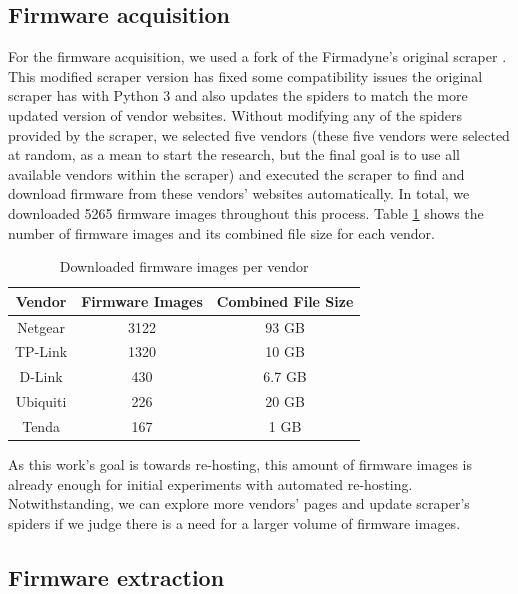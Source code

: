 \documentclass[12pt]{article}
\begin{document}
\subsection{Firmware acquisition}

For the firmware acquisition, we used a fork of the Firmadyne's original scraper \cite{github:scraper}. This modified scraper version has fixed some compatibility issues the original scraper has with Python 3 and also updates the spiders to match the more updated version of vendor websites. Without modifying any of the spiders provided by the scraper, we selected five vendors (these five vendors were selected at random, as a mean to start the research, but the final goal is to use all available vendors within the scraper) and executed the scraper to find and download firmware from these vendors' websites automatically. In total, we downloaded 5265 firmware images throughout this process. Table \ref{tab:scraper} shows the number of firmware images and its combined file size for each vendor.

\begin{table}[h]
\centering
\caption{Downloaded firmware images per vendor}
\begin{tabular}{|c|c|c|}
\hline
\textbf{Vendor} & \textbf{Firmware Images} & \textbf{Combined File Size} \\ \hline
Netgear         & 3122                     & 93 GB                       \\ \hline
TP-Link         & 1320                     & 10 GB                       \\ \hline
D-Link          & 430                      & 6.7 GB                      \\ \hline
Ubiquiti        & 226                      & 20 GB                       \\ \hline
Tenda           & 167                      & 1 GB                        \\ \hline
\end{tabular}
\label{tab:scraper}
\end{table}

As this work's goal is towards re-hosting, this amount of firmware images is already enough for initial experiments with automated re-hosting. Notwithstanding, we can explore more vendors' pages and update scraper's spiders if we judge there is a need for a larger volume of firmware images.

\subsection{Firmware extraction}
\end{document}
